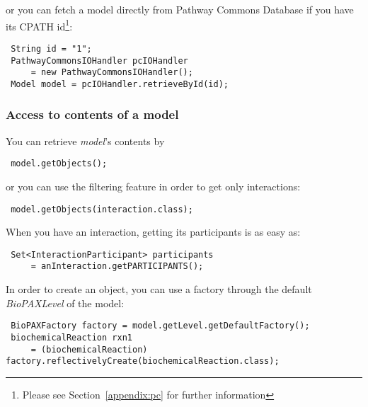 \documentclass[10pt]{article}
\newenvironment{mylisting}
{\begin{list}{}{\setlength{\leftmargin}{2em}}\item\small\bfseries}
{\end{list}}
\begin{document}
or you can fetch a model directly from Pathway Commons Database \cite{pathwaycommons} if you have its CPATH id\footnote{Please see Section~\ref{appendix:pc} for further information}:
\begin{mylisting}
\begin{verbatim}
 String id = "1";
 PathwayCommonsIOHandler pcIOHandler 
     = new PathwayCommonsIOHandler();
 Model model = pcIOHandler.retrieveById(id);
\end{verbatim}
\end{mylisting}

\subsubsection{Access to contents of a model}
You can retrieve \textit{model}'s contents by

\begin{mylisting}
\begin{verbatim}
 model.getObjects();
\end{verbatim}
\end{mylisting}

or you can use the filtering feature in order to get only interactions:

\begin{mylisting}
\begin{verbatim}
 model.getObjects(interaction.class);
\end{verbatim}
\end{mylisting}

When you have an interaction, getting its participants is as easy as:

\begin{mylisting}
\begin{verbatim}
 Set<InteractionParticipant> participants 
     = anInteraction.getPARTICIPANTS();
\end{verbatim}
\end{mylisting}

In order to create an object, you can use a factory through the default \textit{BioPAXLevel} of the model:

\begin{mylisting}
\begin{verbatim}
 BioPAXFactory factory = model.getLevel.getDefaultFactory();
 biochemicalReaction rxn1 
     = (biochemicalReaction) factory.reflectivelyCreate(biochemicalReaction.class);
\end{verbatim}
\end{mylisting}
\end{document}
